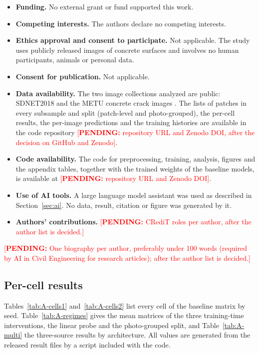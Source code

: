 \documentclass[pdflatex,sn-apa]{sn-jnl}
\newcommand{\pend}[1]{\textcolor{red}{[\textbf{PENDING:} #1]}}
\begin{document}
\begin{itemize}
\item \textbf{Funding.} No external grant or fund supported this work.
\item \textbf{Competing interests.} The authors declare no competing interests.
\item \textbf{Ethics approval and consent to participate.} Not applicable. The study uses publicly released images of concrete surfaces and involves no human participants, animals or personal data.
\item \textbf{Consent for publication.} Not applicable.
\item \textbf{Data availability.} The two image collections analyzed are public: SDNET2018 \citep{maguire2018sdnetdata} and the METU concrete crack images \citep{ozgenel2019metu}. The lists of patches in every subsample and split (patch-level and photo-grouped), the per-cell results, the per-image predictions and the training histories are available in the code repository \pend{repository URL and Zenodo DOI, after the decision on GitHub and Zenodo}.
\item \textbf{Code availability.} The code for preprocessing, training, analysis, figures and the appendix tables, together with the trained weights of the baseline models, is available at \pend{repository URL and Zenodo DOI}.
\item \textbf{Use of AI tools.} A large language model assistant was used as described in Section~\ref{sec:ai}. No data, result, citation or figure was generated by it.
\item \textbf{Authors' contributions.} \pend{CRediT roles per author, after the author list is decided.}
\end{itemize}

\pend{One biography per author, preferably under 100 words (required by AI in Civil Engineering for research articles); after the author list is decided.}

\begin{appendices}

\section{Per-cell results}\label{secA}

Tables~\ref{tab:A-cells1} and~\ref{tab:A-cells2} list every cell of the baseline matrix by seed. Table~\ref{tab:A-regimes} gives the mean matrices of the three training-time interventions, the linear probe and the photo-grouped split, and Table~\ref{tab:A-multi} the three-source results by architecture. All values are generated from the released result files by a script included with the code.



\clearpage

\end{appendices}


\end{document}
